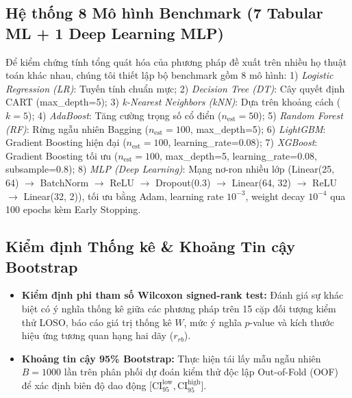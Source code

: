 \documentclass[conference]{IEEEtran}
\begin{document}
\subsection{Hệ thống 8 Mô hình Benchmark (7 Tabular ML + 1 Deep Learning MLP)}
Để kiểm chứng tính tổng quát hóa của phương pháp đề xuất trên nhiều họ thuật toán khác nhau, chúng tôi thiết lập bộ benchmark gồm 8 mô hình:
1) \textit{Logistic Regression (LR)}: Tuyến tính chuẩn mực;
2) \textit{Decision Tree (DT)}: Cây quyết định CART (max\_depth=5);
3) \textit{k-Nearest Neighbors (kNN)}: Dựa trên khoảng cách ($k=5$);
4) \textit{AdaBoost}: Tăng cường trọng số cổ điển ($n_{\text{est}}=50$);
5) \textit{Random Forest (RF)}: Rừng ngẫu nhiên Bagging ($n_{\text{est}}=100$, max\_depth=5);
6) \textit{LightGBM}: Gradient Boosting hiện đại ($n_{\text{est}}=100$, learning\_rate=0.08);
7) \textit{XGBoost}: Gradient Boosting tối ưu ($n_{\text{est}}=100$, max\_depth=5, learning\_rate=0.08, subsample=0.8);
8) \textit{MLP (Deep Learning)}: Mạng nơ-ron nhiều lớp (Linear(25, 64) $\rightarrow$ BatchNorm $\rightarrow$ ReLU $\rightarrow$ Dropout(0.3) $\rightarrow$ Linear(64, 32) $\rightarrow$ ReLU $\rightarrow$ Linear(32, 2)), tối ưu bằng Adam, learning rate $10^{-3}$, weight decay $10^{-4}$ qua 100 epochs kèm Early Stopping.

\subsection{Kiểm định Thống kê \& Khoảng Tin cậy Bootstrap}
\begin{itemize}
    \item \textbf{Kiểm định phi tham số Wilcoxon signed-rank test:} Đánh giá sự khác biệt có ý nghĩa thống kê giữa các phương pháp trên 15 cặp đối tượng kiểm thử LOSO, báo cáo giá trị thống kê $W$, mức ý nghĩa $p$-value và kích thước hiệu ứng tương quan hạng hai dãy ($r_{rb}$).
    \item \textbf{Khoảng tin cậy 95\% Bootstrap:} Thực hiện tái lấy mẫu ngẫu nhiên $B = 1000$ lần trên phân phối dự đoán kiểm thử độc lập Out-of-Fold (OOF) để xác định biên độ dao động [$\text{CI}_{95}^{\text{low}}, \text{CI}_{95}^{\text{high}}$].
\end{itemize}
\end{document}
